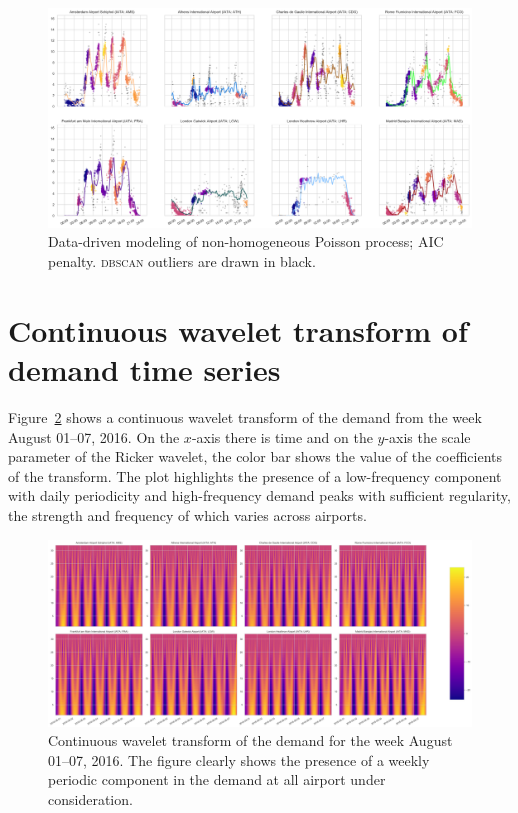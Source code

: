 \documentclass[]{elsarticle}
\newcommand{\DBSCAN}{\textsc{dbscan}}
\begin{document}
  \begin{figure}
      \includegraphics[width=\textwidth]{DDPoisson_AIC}
      \caption{Data-driven modeling of non-homogeneous Poisson process; \ac{AIC} penalty. \DBSCAN{} outliers are drawn in black.}\label{fig:DD_AIC}
  \end{figure}

\section{Continuous wavelet transform of demand time series}\label{sec:appc}

Figure~\ref{fig:cwt} shows a continuous wavelet transform of the demand from the week August 01--07, 2016.
On the \(x\)-axis there is time and on the \(y\)-axis the scale parameter of the Ricker wavelet, the color bar shows the value of the coefficients of the transform. The plot highlights the presence of a low-frequency component with daily periodicity and high-frequency demand peaks with sufficient regularity, the strength and frequency of which varies across airports.

\begin{figure}
  \includegraphics[width=\textwidth]{ContWavltTrasf}
  \caption{Continuous wavelet transform of the demand for the week August 01--07, 2016. The figure clearly shows the presence of a weekly periodic component in the demand at all airport under consideration.}\label{fig:cwt}
\end{figure}
\end{document}
